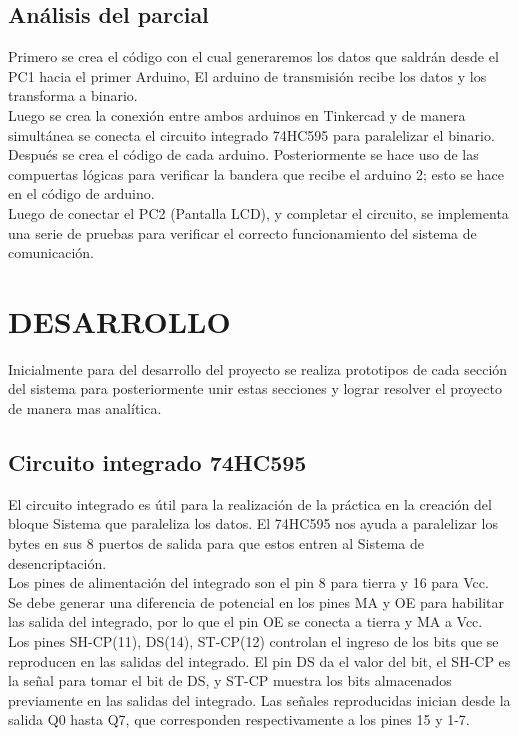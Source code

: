 \documentclass{article}
\begin{document}
\subsection{Análisis del parcial}
	
Primero se crea el código con el cual generaremos los datos que saldrán desde el PC1 hacia el primer Arduino, El arduino de transmisión recibe los datos y los transforma a binario.\\

Luego se crea la conexión entre ambos arduinos en Tinkercad y de manera simultánea se conecta el circuito integrado 74HC595 para paralelizar el binario.
Después se crea el código de cada arduino. 
Posteriormente se hace uso de las compuertas lógicas para verificar la bandera que recibe el arduino 2; esto se hace en el código de arduino.\\

Luego de conectar el PC2 (Pantalla LCD), y completar el circuito, se implementa una serie de pruebas para verificar el correcto funcionamiento del sistema de comunicación. 


\section{DESARROLLO}

Inicialmente para del desarrollo del proyecto se realiza prototipos de cada sección del sistema para posteriormente unir estas secciones y lograr resolver el proyecto de manera mas analítica.

\subsection{Circuito integrado 74HC595}
El circuito integrado es útil para la realización de la práctica en la creación del bloque Sistema que paraleliza los datos. El 74HC595 nos ayuda a paralelizar los bytes en sus 8 puertos de salida para que estos entren al Sistema de desencriptación.\\

Los pines de alimentación del integrado son el pin 8 para tierra y 16 para Vcc.\\

Se debe generar una diferencia de potencial en los pines MA y OE para habilitar las salida del integrado, por lo que el pin OE se conecta a tierra y MA a Vcc.\\

Los pines SH-CP(11), DS(14), ST-CP(12) controlan el ingreso de los bits que se reproducen en las salidas del integrado. El pin DS da el valor del bit, el SH-CP es la señal para tomar el bit de DS, y ST-CP muestra los bits almacenados previamente en las salidas del integrado. Las señales reproducidas inician desde la salida Q0 hasta Q7, que corresponden respectivamente a los pines 15 y 1-7. \cite{youtube}\\
\end{document}
